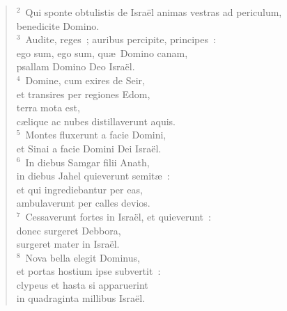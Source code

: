 \begin{flushleft}\begin{verse}\vspace{6pt}${}^{2}$~Qui sponte obtulistis de Isra\"el animas vestras ad periculum,\\ benedicite Domino.\\
${}^{3}$~Audite, reges~; auribus percipite, principes~:\\ ego sum, ego sum, qu\ae\ Domino canam,\\ psallam Domino Deo Isra\"el.\\
${}^{4}$~Domine, cum exires de Seir,\\ et transires per regiones Edom,\\ terra mota est,\\ c\ae lique ac nubes distillaverunt aquis.\\
${}^{5}$~Montes fluxerunt a facie Domini,\\ et Sinai a facie Domini Dei Isra\"el.\\
${}^{6}$~In diebus Samgar filii Anath,\\ in diebus Jahel quieverunt semit\ae~:\\ et qui ingrediebantur per eas,\\ ambulaverunt per calles devios.\\
${}^{7}$~Cessaverunt fortes in Isra\"el, et quieverunt~:\\ donec surgeret Debbora,\\ surgeret mater in Isra\"el.\\
${}^{8}$~Nova bella elegit Dominus,\\ et portas hostium ipse subvertit~:\\ clypeus et hasta si apparuerint\\ in quadraginta millibus Isra\"el.\end{verse}\end{flushleft}


